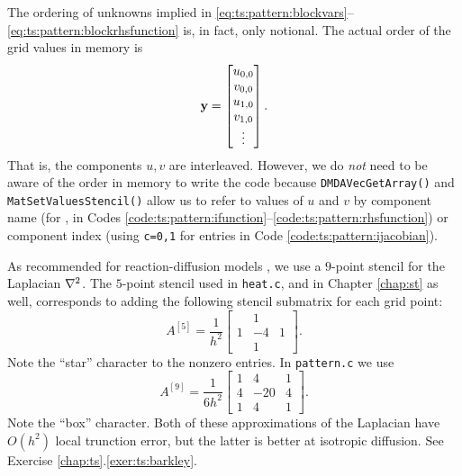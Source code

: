 
The ordering of unknowns implied in \eqref{eq:ts:pattern:blockvars}--\eqref{eq:ts:pattern:blockrhsfunction} is, in fact, only notional.  The actual order of the grid values in memory is
\begin{equation}
\mathbf{y} = \begin{bmatrix} u_{0,0} \\ v_{0,0} \\ u_{1,0} \\ v_{1,0} \\ \vdots \end{bmatrix}. \label{eq:ts:pattern:interleaved}
\end{equation}
That is, the components $u,v$ are interleaved.  However, we do \emph{not} need to be aware of the order in memory to write the code because \texttt{DMDAVecGetArray()} and \texttt{MatSetValuesStencil()} allow us to refer to values of $u$ and $v$ by component name (for \pVecs, in Codes \ref{code:ts:pattern:ifunction}--\ref{code:ts:pattern:rhsfunction}) or component index (using \texttt{c=0,1} for \pMat entries in Code \ref{code:ts:pattern:ijacobian}).


As recommended for reaction-diffusion models \citep[section III.6]{HundsdorferVerwer2003}, we use a $9$-point stencil for the Laplacian $\nabla^2$.  The $5$-point stencil used in \texttt{heat.c}, and in Chapter \ref{chap:st} as well, corresponds to adding the following stencil submatrix for each grid point:
\begin{equation}
A^{[5]} = \frac{1}{h^2} \begin{bmatrix}
	 & 1 & \\
	1 & -4 & 1 \\
	  &  1 & 
	\end{bmatrix}.  \label{eq:ts:pattern:fivepoint}
\end{equation}
Note the ``star'' character to the nonzero entries.  In \texttt{pattern.c} we use
\begin{equation}
A^{[9]} = \frac{1}{6h^2} \begin{bmatrix}
	1 &   4 & 1\\
	4 & -20 & 4 \\
	1 &   4 & 1
	\end{bmatrix}.  \label{eq:ts:pattern:ninepoint}
\end{equation}
Note the ``box'' character.  Both of these approximations of the Laplacian have $O(h^2)$ local trunction error, but the latter is better at isotropic diffusion.  See Exercise \ref{chap:ts}.\ref{exer:ts:barkley}.

